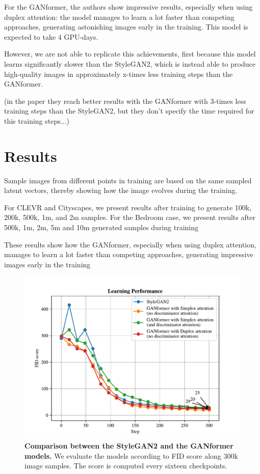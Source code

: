 \documentclass{article}
\begin{document}
	For the GANformer, the authors \cite{karras2020analyzing} show impressive results, especially when 
	using duplex attention: the model manages to learn a lot faster than competing approaches, 
	generating astonishing images early in the training. This model is expected to take 4 GPU-days.
	
	However, we are not able to replicate this achievements, first because this model learns significantly 
	slower than the StyleGAN2, which is instead able to produce high-quality images in approximately 
	x-times less training steps than the GANformer.
	
	(in the paper they reach better results with the GANformer with 3-times less training steps than the 
	StyleGAN2, but they don't specify the time required for this training steps...)

	\section{Results}%
	
	Sample images from different points in training are based on the same sampled latent vectors, 
	thereby showing how the image evolves during the training.
		
	For CLEVR and Cityscapes, we present results after training to generate 100k, 200k, 500k, 1m, and 
	2m samples. For the Bedroom case, we present results after 500k, 1m, 2m, 5m and 10m generated 
	samples during training
	
	These results show how the GANformer, especially when using duplex attention, manages to learn a 
	lot faster than competing approaches, generating impressive images early in the training
	
	\begin{figure}[htpb]				
		\centering
		\includegraphics[width=.7\linewidth]{../src/trained_network/out_imgs/FIDscore.pdf}
		\caption{\textbf{Comparison between the StyleGAN2 and the GANformer models.} We evaluate 
		the models according to FID score along 300k image samples. The score is computed every 
		sixteen checkpoints.}
		\label{fig:performance}
	\end{figure}
	
\end{document}
